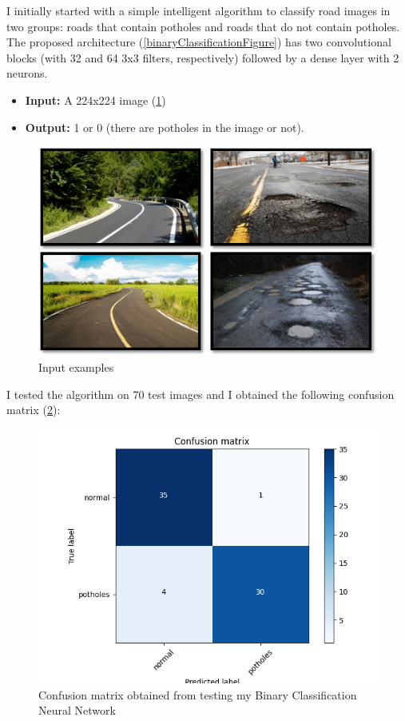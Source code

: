 \documentclass[runningheads,a4paper,11pt]{report}
\begin{document}
\newpage
I initially started with a simple intelligent algorithm to classify road images in two groups: roads that contain potholes and roads that do not contain potholes.
The proposed architecture (\ref{binaryClassificationFigure}) has two convolutional blocks (with 32 and 64 3x3 filters, respectively) followed by a dense layer with 2 neurons.
\begin{itemize}
	\item \textbf{Input:} A 224x224 image (\ref{binaryClassificationExamples})
	\item \textbf{Output:} 1 or 0 (there are potholes in the image or not).
\end{itemize}

\begin{figure}[htbp]
    \centerline{\includegraphics{assets/binaryClassificationExamples.png}}  
    \caption{Input examples}
    \label{binaryClassificationExamples}
\end{figure}

\newpage
I tested the algorithm on 70 test images and I obtained the following confusion matrix (\ref{binaryClassificationCM}):

\begin{figure}[htbp]
    \centerline{\includegraphics{assets/binaryClassificationCM.png}}  
    \caption{Confusion matrix obtained from testing my Binary Classification Neural Network}
    \label{binaryClassificationCM}
\end{figure}
\end{document}
